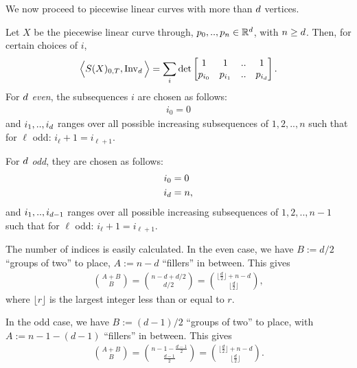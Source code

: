 We now proceed to piecewise linear curves with more than $d$ vertices.
\begin{lemma}
  \label{lem:generalPiecewiseLinearCurve}
  Let $X$ be the piecewise linear curve through,
  $p_0,..,p_n \in \mathbb{R}^d$, with $n \ge d$.
  Then, for certain choices of $i$,
  \begin{align}
    \label{eq:invDet}
    \Big\langle S(X)_{0,T}, \operatorname{Inv}_{d} \Big\rangle
    =
    \sum_i
     \det\left[
       \begin{matrix}
         1 & 1 & .. & 1 \\
         p_{i_0} & p_{i_1} & .. & p_{i_{d}}
       \end{matrix}
     \right].
  \end{align}
  For $d$ \emph{even}, the subsequences $i$ are chosen as follows:
  \begin{align*}
    i_0 = 0
  \end{align*}
  and $i_1,..,i_{d}$ ranges over all possible increasing
  subsequences of $1,2,..,n$ such that
  for $\ell$ odd: $i_\ell + 1 = i_{\ell+1}$.

  For $d$ \emph{odd}, they are chosen as follows:
  \begin{align*}
    i_0 &= 0 \\
    i_{d} &= n,
  \end{align*}
  and $i_1,..,i_{d-1}$ ranges over all possible increasing
  subsequences of $1,2,..,n-1$ such that
  for $\ell$ odd: $i_\ell + 1 = i_{\ell+1}$.
\end{lemma}
\begin{remark}
  The number of indices is easily calculated.
  In the even case,
  we have
  $B := d/2$ ``groups of two'' to place,
  $A := n - d$ ``fillers'' in between.
  This gives
  \begin{align*}
    \binom{ A + B }{ B }
    =
    \binom{n-d + d/2 }{ d/2 }
    =
    \binom{ \lfloor\frac{d}{2}\rfloor + n - d }{ \lfloor\frac{d}{2}\rfloor },
  \end{align*}
  where $\lfloor r \rfloor$ is the largest integer less than or equal to $r$.

  In the odd case,
  we have $B :=(d-1)/2$ ``groups of two'' to place,
  with $A := n-1 - (d-1)$ ``fillers'' in between.
  This gives
  \begin{align*}
    \binom{ A + B }{ B }
    =
    \binom{ n-1 - \frac{d-1}{2} }{ \frac{d-1}{2} }
    =
    \binom{ \lfloor\frac{d}{2}\rfloor + n - d }{ \lfloor\frac{d}{2}\rfloor }.
  \end{align*}
\end{remark}
